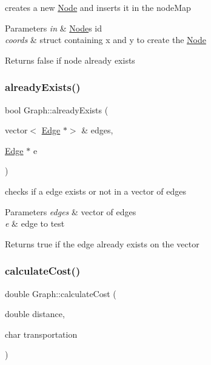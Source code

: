 creates a new \hyperlink{class_node}{Node} and inserts it in the node\+Map 


\begin{DoxyParams}{Parameters}
{\em in} & \hyperlink{class_node}{Node}\textquotesingle{}s id \\
\hline
{\em coords} & struct containing x and y to create the \hyperlink{class_node}{Node} \\
\hline
\end{DoxyParams}
\begin{DoxyReturn}{Returns}
false if node already exists 
\end{DoxyReturn}
\mbox{\label{class_graph_ac2c3047c6f7bd231ad43368b60426b82}} 
\subsubsection{\texorpdfstring{already\+Exists()}{alreadyExists()}}
{\footnotesize\ttfamily bool Graph\+::already\+Exists (\begin{DoxyParamCaption}\item[{vector$<$ \hyperlink{class_edge}{Edge} $\ast$$>$ \&}]{edges,  }\item[{\hyperlink{class_edge}{Edge} $\ast$}]{e }\end{DoxyParamCaption})}



checks if a edge exists or not in a vector of edges 


\begin{DoxyParams}{Parameters}
{\em edges} & vector of edges \\
\hline
{\em e} & edge to test \\
\hline
\end{DoxyParams}
\begin{DoxyReturn}{Returns}
true if the edge already exists on the vector 
\end{DoxyReturn}
\mbox{\label{class_graph_ade91157ec8ddc4d67c30c1009277923e}} 
\subsubsection{\texorpdfstring{calculate\+Cost()}{calculateCost()}}
{\footnotesize\ttfamily double Graph\+::calculate\+Cost (\begin{DoxyParamCaption}\item[{double}]{distance,  }\item[{char}]{transportation }\end{DoxyParamCaption})}



